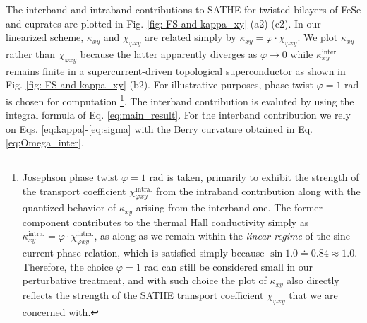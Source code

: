 The interband and intraband contributions to SATHE for twisted bilayers of FeSe and cuprates are plotted in Fig. \ref{fig: FS and kappa_xy} (a2)-(c2). In our linearized scheme, $\kappa_{xy}$ and $\chi_{\varphi xy}$ are related simply by $\kappa_{xy} = \varphi \cdot \chi_{\varphi xy}$. We plot $\kappa_{xy}$ rather than $\chi_{\varphi xy}$ because the latter apparently diverges as $\varphi \rightarrow 0$ while $\kappa_{xy}^{\text{inter.}}$ remains finite in a supercurrent-driven topological superconductor as shown in Fig. \ref{fig: FS and kappa_xy} (b2). For illustrative purposes, phase twist $\varphi=1$ rad is chosen for computation \footnote{Josephson phase twist $\varphi=1$ rad is taken, primarily to exhibit the strength of the transport coefficient $\chi_{\varphi xy}^{\text{intra.}}$ from the intraband contribution along with the quantized behavior of $\kappa_{xy}$ arising from the interband one. The former component contributes to the thermal Hall conductivity simply as $\kappa_{xy}^{\text{intra.}}=\varphi\cdot\chi_{\varphi xy}^{\text{intra.}}$, as along as we remain within the \emph{linear regime} of the sine current-phase relation, which is satisfied simply because $\sin1.0\doteq0.84\approx1.0$. Therefore, the choice $\varphi=1$ rad can still be considered small in our perturbative treatment, and with such choice the plot of $\kappa_{xy}$ also directly reflects the strength of the SATHE transport coefficient $\chi_{\varphi xy}$ that we are concerned with.}. The interband contribution is evaluted by using the integral formula of Eq. \eqref{eq:main_result}. For the interband contribution we rely on Eqs. \eqref{eq:kappa}-\eqref{eq:sigma} with the Berry curvature obtained in Eq. \eqref{eq:Omega_inter}. 

